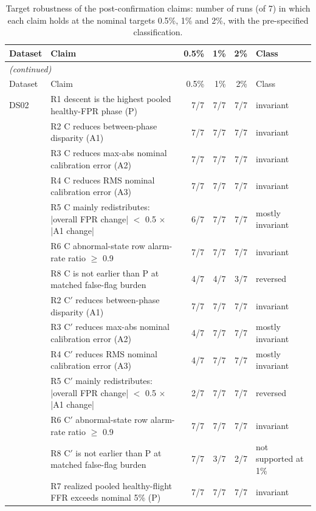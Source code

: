 \begin{scriptsize}
\begin{longtable}{lp{}rrrl}
\caption{Target robustness of the post-confirmation claims: number of runs (of 7) in which each claim holds at the nominal targets 0.5\%, 1\% and 2\%, with the pre-specified classification.}\label{tab:s10_robustness}\\
\toprule
Dataset & Claim & 0.5\% & 1\% & 2\% & Class \\
\midrule
\endfirsthead
\multicolumn{6}{l}{\emph{(continued)}}\\
\toprule
Dataset & Claim & 0.5\% & 1\% & 2\% & Class \\
\midrule
\endhead
\bottomrule
\endfoot
DS02 & R1 descent is the highest pooled healthy-FPR phase (P) & 7/7 & 7/7 & 7/7 & invariant \\
 & R2 C reduces between-phase disparity (A1) & 7/7 & 7/7 & 7/7 & invariant \\
 & R3 C reduces max-abs nominal calibration error (A2) & 7/7 & 7/7 & 7/7 & invariant \\
 & R4 C reduces RMS nominal calibration error (A3) & 7/7 & 7/7 & 7/7 & invariant \\
 & R5 C mainly redistributes: |overall FPR change| $<$ 0.5 $\times$ |A1 change| & 6/7 & 7/7 & 7/7 & mostly invariant \\
 & R6 C abnormal-state row alarm-rate ratio $\geq$ 0.9 & 7/7 & 7/7 & 7/7 & invariant \\
 & R8 C is not earlier than P at matched false-flag burden & 4/7 & 4/7 & 3/7 & reversed \\
 & R2 C$'$ reduces between-phase disparity (A1) & 7/7 & 7/7 & 7/7 & invariant \\
 & R3 C$'$ reduces max-abs nominal calibration error (A2) & 4/7 & 7/7 & 7/7 & mostly invariant \\
 & R4 C$'$ reduces RMS nominal calibration error (A3) & 4/7 & 7/7 & 7/7 & mostly invariant \\
 & R5 C$'$ mainly redistributes: |overall FPR change| $<$ 0.5 $\times$ |A1 change| & 2/7 & 7/7 & 7/7 & reversed \\
 & R6 C$'$ abnormal-state row alarm-rate ratio $\geq$ 0.9 & 7/7 & 7/7 & 7/7 & invariant \\
 & R8 C$'$ is not earlier than P at matched false-flag burden & 7/7 & 3/7 & 2/7 & not supported at 1\% \\
 & R7 realized pooled healthy-flight FFR exceeds nominal 5\% (P) & 7/7 & 7/7 & 7/7 & invariant \\

\end{longtable}
\end{scriptsize}
